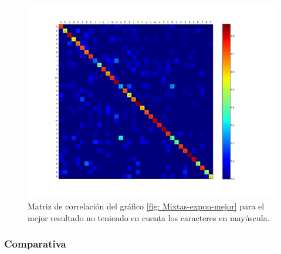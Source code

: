 			\begin{figure}[htbp]
				\centerline{\includegraphics[scale=0.4]{img/resultados/mixtas/best_expon_matrix_Alpha0,1_4080-4_ins.png}}
				\caption[Matriz de correlación ``case insensitive'' para mixtas expon]{Matriz de correlación del gráfico \ref{fig: Mixtas-expon-mejor} para el mejor resultado no teniendo en cuenta los caracteres en mayúscula.}
				\label{fig: MatrizIns-Mixtas-expon}
			\end{figure}
	
    	\subsubsection{Comparativa}

    	